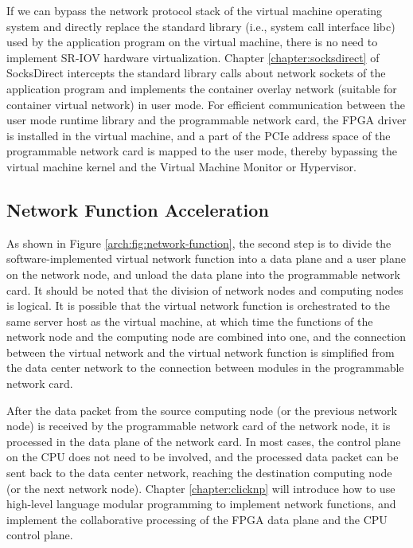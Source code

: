 If we can bypass the network protocol stack of the virtual machine operating system and directly replace the standard library (i.e., system call interface libc) used by the application program on the virtual machine, there is no need to implement SR-IOV hardware virtualization.
Chapter \ref{chapter:socksdirect} of SocksDirect intercepts the standard library calls about network sockets of the application program and implements the container overlay network (suitable for container virtual network) in user mode.
For efficient communication between the user mode runtime library and the programmable network card, the FPGA driver is installed in the virtual machine, and a part of the PCIe address space of the programmable network card is mapped to the user mode, thereby bypassing the virtual machine kernel and the Virtual Machine Monitor or Hypervisor.

\subsection{Network Function Acceleration}

As shown in Figure \ref{arch:fig:network-function}, the second step is to divide the software-implemented virtual network function into a data plane and a user plane on the network node, and unload the data plane into the programmable network card.
It should be noted that the division of network nodes and computing nodes is logical. It is possible that the virtual network function is orchestrated to the same server host as the virtual machine, at which time the functions of the network node and the computing node are combined into one, and the connection between the virtual network and the virtual network function is simplified from the data center network to the connection between modules in the programmable network card.

After the data packet from the source computing node (or the previous network node) is received by the programmable network card of the network node, it is processed in the data plane of the network card. In most cases, the control plane on the CPU does not need to be involved, and the processed data packet can be sent back to the data center network, reaching the destination computing node (or the next network node).
Chapter \ref{chapter:clicknp} will introduce how to use high-level language modular programming to implement network functions, and implement the collaborative processing of the FPGA data plane and the CPU control plane.

